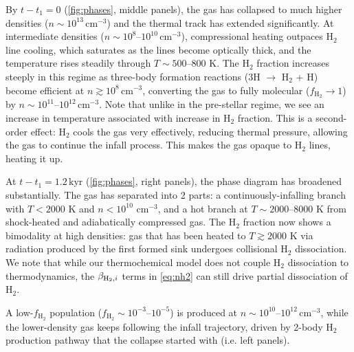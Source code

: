 \documentclass[twocolumn]{openjournal}
\newcommand{\kyr}{\,\mathrm{kyr}}
\newcommand{\tform}{t_1}
\begin{document}
By $t - \tform = 0$ (\autoref{fig:phases}, middle panels), the gas has
collapsed to much higher densities
($n \sim 10^{13}\,\mathrm{cm}^{-3}$) and the thermal track has
extended significantly.
At intermediate densities ($n \sim 10^8$--$10^{10}\,\mathrm{cm}^{-3}$),
compressional heating outpaces H$_2$ line cooling, which saturates
as the lines become optically thick, and the temperature rises
steadily through $T \sim 500$--$800$ K.
The H$_2$ fraction increases steeply in this regime as three-body
formation reactions (3H $\to$ H$_2$ + H) become efficient at
$n \gtrsim 10^8\,\mathrm{cm}^{-3}$, converting the gas to fully
molecular ($f_{\mathrm{H}_2} \to 1$) by
$n \sim 10^{11}$--$10^{12}\,\mathrm{cm}^{-3}$.
Note that unlike in the pre-stellar regime, we see an increase in temperature
associated with increase in H$_2$ fraction. This is a second-order effect:
H$_2$ cools the gas very effectively, reducing thermal pressure, allowing the
gas to continue the infall process. This makes the gas opaque to H$_2$ lines,
heating it up. \citep{ripamonti_fragmentation_2004}


At $t - \tform = 1.2\kyr$ (\autoref{fig:phases}, right panels), the phase
diagram has broadened substantially. The gas has separated into 2 parts: a
continuously-infalling branch with $T < 2000$ K and $n < 10^{10}$ cm$^{-3}$,
and a hot branch at $T \sim 2000$--$8000$ K from shock-heated and adiabatically
compressed gas.
The H$_2$ fraction now shows a bimodality at high densities: gas that has been
heated to $T \gtrsim 2000$ K via radiation produced by the first formed sink
undergoes collisional H$_2$ dissociation.
We note that while our thermochemical model does not couple
H$_2$ dissociation to thermodynamics, the $\beta_{{\rm H}_2, i}$
terms in \autoref{eq:nh2} can still drive partial dissociation of H$_2$.

A low-$f_{\mathrm{H}_2}$ population
($f_{\mathrm{H}_2} \sim 10^{-3}$--$10^{-5}$) is produced at
$n \sim 10^{10}$--$10^{12}\,\mathrm{cm}^{-3}$, while
the lower-density gas keeps following the infall trajectory, driven by 2-body
H$_2$ production pathway that the collapse started with (i.e. left panels).
\citep{klessen_glover23}
\end{document}
